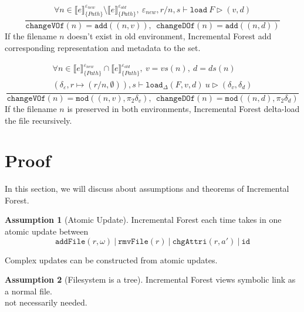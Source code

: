 \documentclass[10pt,twoside,a4paper]{article}
\theoremstyle{theorem}
\theoremstyle{lemma}
\theoremstyle{property}
\theoremstyle{definition}
\theoremstyle{assumption}
\newtheorem{assumption}{Assumption}[section]
\def\snd{\pi_2}
\begin{document}
\begin{displaymath}
	\frac{\begin{array}{c}
	\forall n \in \llbracket e \rrbracket^{\varepsilon_{new}}_{\{Path\}} \setminus \llbracket e \rrbracket^{\varepsilon_{old}}_{\{Path\}}, ~ \varepsilon_{new}, r/n,s \vdash \mathtt{load}~F \rhd (v, d)
	\end{array}}
	{\mathtt{changeVOf}(n) = \mathtt{add}((n,v)), ~~\mathtt{changeDOf}(n) = \mathtt{add}((n,d))}
\end{displaymath}
If the filename $n$ doesn't exist in old environment, Incremental Forest add corresponding representation and metadata to the set.

\begin{displaymath}
	\frac{\begin{array}{c}
	\forall n \in \llbracket e \rrbracket^{\varepsilon_{new}}_{\{Path\}} \cap \llbracket e \rrbracket^{\varepsilon_{old}}_{\{Path\}}, ~ v = vs(n), ~d = ds(n)\\
	(\delta_\varepsilon, r \mapsto (r/n, \emptyset)), s \vdash \mathtt{load}_\Delta (F,v,d)~ u \rhd (\delta_v,\delta_d)
	\end{array}}
	{\mathtt{changeVOf}(n) = \mathtt{mod}((n,v), \snd\delta_v), ~~\mathtt{changeDOf}(n) = \mathtt{mod}((n,d), \snd\delta_d)}
\end{displaymath}
If the filename $n$ is preserved in both environments, Incremental Forest delta-load the file recursively.

\newpage
\section{Proof}
In this section, we will discuss about assumptions and theorems of Incremental Forest.
\begin{assumption}[Atomic Update]
	Incremental Forest each time takes in one atomic update between 
	\begin{displaymath}
		\mathtt{addFile}(r,\omega) ~|~ \mathtt{rmvFile}(r) ~|~ \mathtt{chgAttri}(r,a') ~|~  \mathtt{id}
	\end{displaymath}

\end{assumption}

Complex updates can be constructed from atomic updates.

\begin{assumption}[Filesystem is a tree]
	Incremental Forest views symbolic link as a normal file. \\
	not necessarily needed.
\end{assumption}
\end{document}
